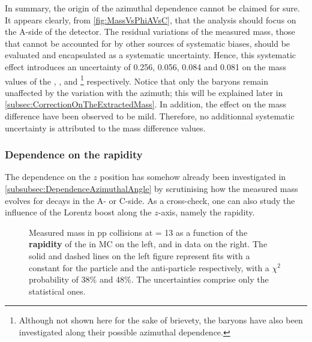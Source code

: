 In summary, the origin of the azimuthal dependence cannot be claimed for sure. It appears clearly, from \figs\ref{fig:MassVsPhiAVsC}, that the analysis should focus on the A-side of the detector. The residual variations of the measured mass, those that cannot be accounted for by other sources of systematic biases, should be evaluated and encapsulated as a systematic uncertainty. Hence, this systematic effect introduces an uncertainty of 0.256, 0.056, 0.084 and 0.081 \mmass on the mass values of the \rmKzeroS, \rmLambdaPM, \rmOmegaM and \rmAomegaP\footnote{Although not shown here for the sake of brievety, the \rmOmegaPM baryons have also been investigated along their possible azimuthal dependence.} respectively. Notice that only the \rmXi baryons remain  unaffected by the variation with the azimuth; this will be explained later in \Sec\ref{subsec:CorrectionOnTheExtractedMass}. In addition, the effect on the mass difference have been observed to be mild. Therefore, no additionnal systematic uncertainty is attributed to the mass difference values.

\subsubsection{Dependence on the rapidity}
\label{subsubsec:RapidityDependence}

The dependence on the $z$ position has somehow already been investigated in \Sec\ref{subsubsec:DependenceAzimuthalAngle} by scrutinising how the measured mass evolves for decays in the A- or C-side. As a cross-check, one can also study the influence of the Lorentz boost along the $z$-axis, namely the rapidity.

\begin{figure}[h]
\hspace*{-1.5cm}
\caption{Measured mass in pp collisions at \sqrtS = 13 \tev as a function of the \textbf{rapidity} of the \rmLambda in MC on the left, and in data on the right. The solid and dashed lines on the left figure represent fits with a constant for the particle and the anti-particle respectively, with a $\chi^{2}$ probability of 38\% and 48\%. The uncertainties comprise only the statistical ones.}
	\label{fig:MassVsRap}
\end{figure}

